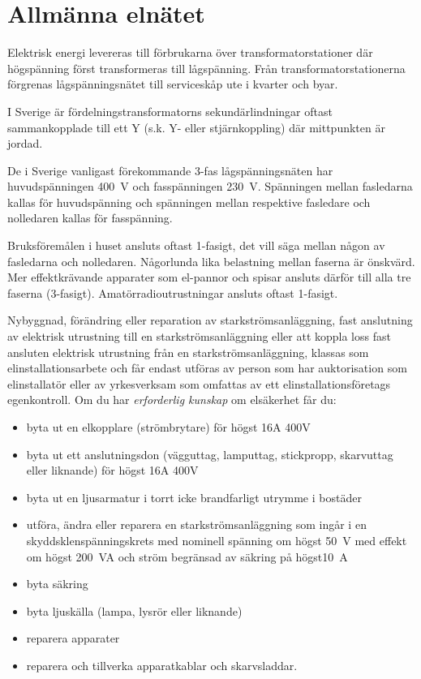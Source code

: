 \section{Allmänna elnätet}
\label{jordning}

Elektrisk energi levereras till förbrukarna över transformatorstationer där
högspänning först transformeras till lågspänning.
Från transformatorstationerna förgrenas lågspänningsnätet till serviceskåp ute
i kvarter och byar.

I Sverige är fördelningstransformatorns sekundärlindningar oftast sammankopplade
till ett Y (s.k. Y- eller stjärnkoppling) där mittpunkten är jordad.

De i Sverige vanligast förekommande 3-fas lågspänningsnäten har huvudspänningen
\SI{400}{\volt} och fasspänningen \SI{230}{\volt}.
Spänningen mellan fasledarna kallas för huvudspänning och spänningen mellan
respektive fasledare och nolledaren kallas för fasspänning.

Bruksföremålen i huset ansluts oftast 1-fasigt, det vill säga mellan någon av
fasledarna och nolledaren.
Någorlunda lika belastning mellan faserna är önskvärd.
Mer effektkrävande apparater som el-pannor och spisar ansluts därför till alla
tre faserna (3-fasigt).
Amatörradioutrustningar ansluts oftast 1-fasigt.

Nybyggnad, förändring eller reparation av starkströmsanläggning,
fast anslutning av elektrisk utrustning till en starkströmsanläggning
eller att koppla loss fast ansluten elektrisk utrustning från en
starkströmsanläggning, klassas som elinstallationsarbete och får endast
utföras av person som har auktorisation som elinstallatör eller av
yrkesverksam som omfattas av ett elinstallationsföretags egenkontroll.
Om du har \emph{erforderlig kunskap} om elsäkerhet får du:

\begin{itemize}
\item byta ut en elkopplare (strömbrytare) för högst 16A 400V
\item byta ut ett anslutningsdon (vägguttag, lamputtag, stickpropp,
skarvuttag eller liknande) för högst 16A 400V
\item byta ut en ljusarmatur i torrt icke brandfarligt utrymme i bostäder
\item utföra, ändra eller reparera en starkströmsanläggning som ingår i en
skyddsklenspänningskrets med nominell spänning om högst \SI{50}{\volt} med
effekt om högst 200~VA och ström begränsad av säkring på högst\SI{10}{\ampere}
\item byta säkring
\item byta ljuskälla (lampa, lysrör eller liknande)
\item reparera apparater
\item reparera och tillverka apparatkablar och skarvsladdar.
\end{itemize}

